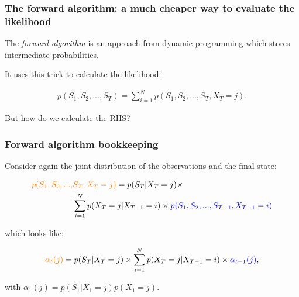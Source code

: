 \documentclass[main.tex]{subfiles}
\begin{document}
\begin{frame}
\frametitle{The forward algorithm: a much cheaper way to evaluate the likelihood}

The \textit{forward algorithm} is an approach from dynamic programming which stores intermediate probabilities.

\vspace{0.5cm}

It uses this trick to calculate the likelihood:

\begin{equation}
    \begin{aligned}
    p(S_1, S_2, ..., S_T) = \sum_{i=1}^N p(S_1, S_2, ..., S_T, X_T=j).
    \end{aligned}
\end{equation}

\vspace{0.5cm}

But how do we calculate the RHS?
    
\end{frame}

\begin{frame}
\frametitle{Forward algorithm bookkeeping}

Consider again the joint distribution of the observations and the final state:

\begin{equation}
    \begin{aligned}
    \textcolor{orange}{p(S_1, S_2, ..., }&\textcolor{orange}{S_T, X_T=j)} = p(S_T | X_T = j) \times\\ &\sum_{i=1}^N p(X_T=j | X_{T-1}=i) \times \textcolor{blue}{p(S_1, S_2, ..., S_{T-1}, X_{T-1}=i)}
    \end{aligned}
\end{equation}

which looks like:

\begin{equation}
    \begin{aligned}
    \textcolor{orange}{\alpha_t(j)} = p(S_T | X_T = j) \times\sum_{i=1}^N p(X_T=j | X_{T-1}=i) \times \textcolor{blue}{\alpha_{t-1}(j)},
    \end{aligned}
\end{equation}

with $\alpha_1(j)=p(S_1 | X_1 = j)p(X_1=j)$.
    
\end{frame}
\end{document}
